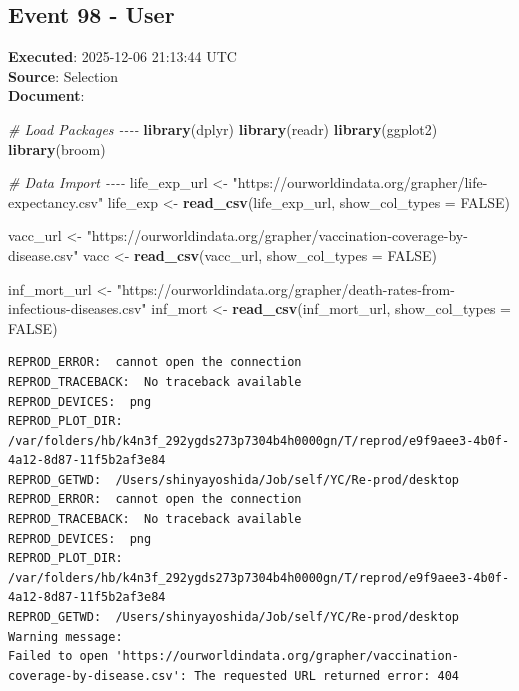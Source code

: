 \documentclass[
  11pt,
]{article}
\newenvironment{Shaded}{\begin{snugshade}}{\end{snugshade}}
\newcommand{\AttributeTok}[1]{\textcolor[rgb]{0.13,0.29,0.53}{#1}}
\newcommand{\CommentTok}[1]{\textcolor[rgb]{0.56,0.35,0.01}{\textit{#1}}}
\newcommand{\ConstantTok}[1]{\textcolor[rgb]{0.56,0.35,0.01}{#1}}
\newcommand{\FunctionTok}[1]{\textcolor[rgb]{0.13,0.29,0.53}{\textbf{#1}}}
\newcommand{\NormalTok}[1]{#1}
\newcommand{\OtherTok}[1]{\textcolor[rgb]{0.56,0.35,0.01}{#1}}
\newcommand{\StringTok}[1]{\textcolor[rgb]{0.31,0.60,0.02}{#1}}
\newenvironment{rpoutput}{\vspace{0.5em}\begin{snugshade}}{\end{snugshade}}
\begin{document}
\subsection{Event 98 - User}\label{event-98---user}

\textbf{Executed}: 2025-12-06 21:13:44 UTC\\
\textbf{Source}: Selection\\
\textbf{Document}:

\begin{Shaded}
\begin{Highlighting}[]
\CommentTok{\# Load Packages {-}{-}{-}{-}}
\FunctionTok{library}\NormalTok{(dplyr)}
\FunctionTok{library}\NormalTok{(readr)}
\FunctionTok{library}\NormalTok{(ggplot2)}
\FunctionTok{library}\NormalTok{(broom)}

\CommentTok{\# Data Import {-}{-}{-}{-}}
\NormalTok{life\_exp\_url }\OtherTok{\textless{}{-}} \StringTok{"https://ourworldindata.org/grapher/life{-}expectancy.csv"}
\NormalTok{life\_exp }\OtherTok{\textless{}{-}} \FunctionTok{read\_csv}\NormalTok{(life\_exp\_url, }\AttributeTok{show\_col\_types =} \ConstantTok{FALSE}\NormalTok{)}

\NormalTok{vacc\_url }\OtherTok{\textless{}{-}} \StringTok{"https://ourworldindata.org/grapher/vaccination{-}coverage{-}by{-}disease.csv"}
\NormalTok{vacc }\OtherTok{\textless{}{-}} \FunctionTok{read\_csv}\NormalTok{(vacc\_url, }\AttributeTok{show\_col\_types =} \ConstantTok{FALSE}\NormalTok{)}

\NormalTok{inf\_mort\_url }\OtherTok{\textless{}{-}} \StringTok{"https://ourworldindata.org/grapher/death{-}rates{-}from{-}infectious{-}diseases.csv"}
\NormalTok{inf\_mort }\OtherTok{\textless{}{-}} \FunctionTok{read\_csv}\NormalTok{(inf\_mort\_url, }\AttributeTok{show\_col\_types =} \ConstantTok{FALSE}\NormalTok{)}
\end{Highlighting}
\end{Shaded}

\begin{rpoutput}

\begin{verbatim}
REPROD_ERROR:  cannot open the connection 
REPROD_TRACEBACK:  No traceback available  
REPROD_DEVICES:  png 
REPROD_PLOT_DIR:  /var/folders/hb/k4n3f_292ygds273p7304b4h0000gn/T/reprod/e9f9aee3-4b0f-4a12-8d87-11f5b2af3e84 
REPROD_GETWD:  /Users/shinyayoshida/Job/self/YC/Re-prod/desktop 
REPROD_ERROR:  cannot open the connection 
REPROD_TRACEBACK:  No traceback available  
REPROD_DEVICES:  png 
REPROD_PLOT_DIR:  /var/folders/hb/k4n3f_292ygds273p7304b4h0000gn/T/reprod/e9f9aee3-4b0f-4a12-8d87-11f5b2af3e84 
REPROD_GETWD:  /Users/shinyayoshida/Job/self/YC/Re-prod/desktop 
Warning message:
Failed to open 'https://ourworldindata.org/grapher/vaccination-coverage-by-disease.csv': The requested URL returned error: 404 
\end{verbatim}

\end{rpoutput}
\end{document}
